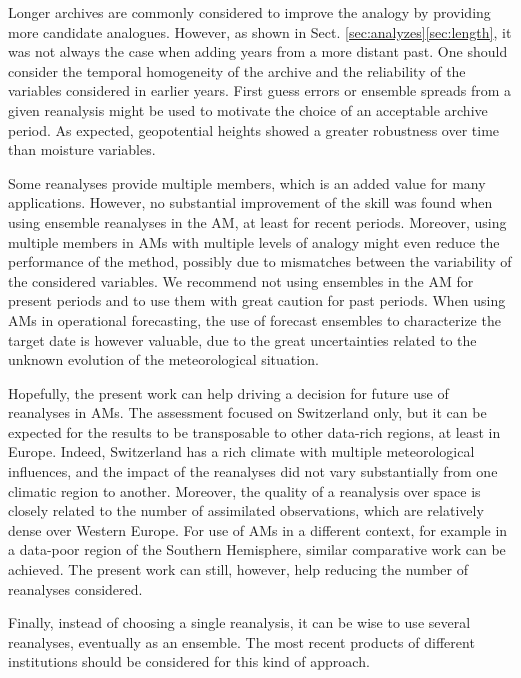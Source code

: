 \documentclass{ametsoc}
\begin{document}
Longer archives are commonly considered to improve the analogy by providing more candidate analogues. However, as shown in Sect. \ref{sec:analyzes}\ref{sec:length}, it was not always the case when adding years from a more distant past. One should consider the temporal homogeneity of the archive and the reliability of the variables considered in earlier years. First guess errors or ensemble spreads from a given reanalysis might be used to motivate the choice of an acceptable archive period. As expected, geopotential heights showed a greater robustness over time than moisture variables. 

Some reanalyses provide multiple members, which is an added value for many applications. However, no substantial improvement of the skill was found when using ensemble reanalyses in the AM, at least for recent periods. Moreover, using multiple members in AMs with multiple levels of analogy might even reduce the performance of the method, possibly due to mismatches between the variability of the considered variables. We recommend not using ensembles in the AM for present periods and to use them with great caution for past periods. When using AMs in operational forecasting, the use of forecast ensembles to characterize the target date is however valuable, due to the great uncertainties related to the unknown evolution of the meteorological situation.

Hopefully, the present work can help driving a decision for future use of reanalyses in AMs. The assessment focused on Switzerland only, but it can be expected for the results to be transposable to other data-rich regions, at least in Europe. Indeed, Switzerland has a rich climate with multiple meteorological influences, and the impact of the reanalyses did not vary substantially from one climatic region to another. Moreover, the quality of a reanalysis over space is closely related to the number of assimilated observations, which are relatively dense over Western Europe. For use of AMs in a different context, for example in a data-poor region of the Southern Hemisphere, similar comparative work can be achieved. The present work can still, however, help reducing the number of reanalyses considered.

Finally, instead of choosing a single reanalysis, it can be wise to use several reanalyses, eventually as an ensemble. The most recent products of different institutions should be considered for this kind of approach.
\end{document}
